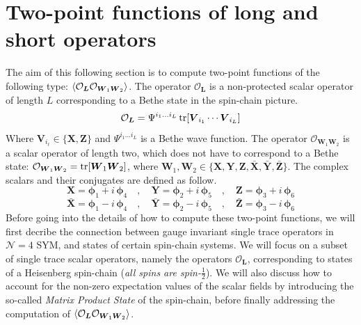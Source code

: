 %
\section{Two-point functions of long and short operators}\label{sec:NPO}
The aim of this following section is to compute two-point functions of the following type: $\expval{\mathcal{O}_{\boldsymbol{L}} \mathcal{O}_{\boldsymbol{W}_1 \boldsymbol{W}_2}}$. The operator $\mathcal{O}_{\boldsymbol{L}}$ is a non-protected scalar operator of length $L$ corresponding to a Bethe state in the spin-chain picture.
%
%
\begin{equation}
\mathcal{O}_{\boldsymbol{L}} = \Psi^{i_1 \ldots i_L}\tr[\boldsymbol{V}_{i_1} \cdots \boldsymbol{V}_{i_L}]
\end{equation}
%
%
Where $\boldsymbol{V}_{i_\ell} \in \{ \boldsymbol{X}, \boldsymbol{Z} \}$ and $\Psi^{i_1 \ldots i_L}$ is a Bethe wave function. The operator $\mathcal{O}_{\boldsymbol{W}_1 \boldsymbol{W}_2}$ is a scalar operator of length two, which does not have to correspond to a Bethe state: $\mathcal{O}_{\boldsymbol{W}_1 \boldsymbol{W}_2} = \tr[\boldsymbol{W}_1 \boldsymbol{W}_2]$, where $\boldsymbol{W}_1, \boldsymbol{W}_2 \in \{ \boldsymbol{X}, \boldsymbol{Y}, \boldsymbol{Z}, \boldsymbol{\bar{X}}, \boldsymbol{\bar{Y}}, \boldsymbol{\bar{Z}} \}$. The complex scalars and their conjugates are defined as follow.
%
%
\begin{equation}
\boldsymbol{X} = \boldsymbol{\phi}_1 + i \, \boldsymbol{\phi}_4
%
\quad , \quad
%
\boldsymbol{Y} = \boldsymbol{\phi}_2 + i \, \boldsymbol{\phi}_5
%
\quad , \quad
%
\boldsymbol{Z} = \boldsymbol{\phi}_3 + i \, \boldsymbol{\phi}_6
\end{equation}
%
%
\begin{equation}
\boldsymbol{\bar{X}} = \boldsymbol{\phi}_1 - i \, \boldsymbol{\phi}_4
%
\quad , \quad
%
\boldsymbol{\bar{Y}} = \boldsymbol{\phi}_2 - i \, \boldsymbol{\phi}_5
%
\quad , \quad
%
\boldsymbol{\bar{Z}} = \boldsymbol{\phi}_3 - i \, \boldsymbol{\phi}_6
\end{equation}
%
%
Before going into the details of how to compute these two-point functions, we will first decribe the connection between gauge invariant single trace operators in $\mathcal{N} = 4$ SYM, and states of certain spin-chain systems. We will focus on a subset of single trace scalar operators, namely the operators $\mathcal{O}_{\boldsymbol{L}}$, corresponding to states of a Heisenberg spin-chain (\textit{all spins are spin-$\frac{1}{2}$}). We will also discuss how to account for the non-zero expectation values of the scalar fields by introducing the so-called \textit{Matrix Product State} of the spin-chain, before finally addressing the computation of $\expval{\mathcal{O}_{\boldsymbol{L}} \mathcal{O}_{\boldsymbol{W}_1 \boldsymbol{W}_2}}$.

